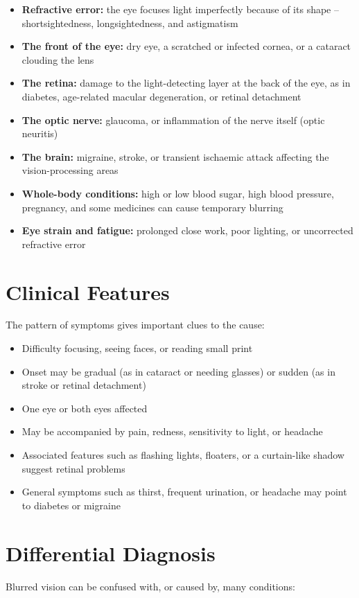\begin{itemize}
    \item \textbf{Refractive error:} the eye focuses light imperfectly because of its shape -- shortsightedness, longsightedness, and astigmatism
    \item \textbf{The front of the eye:} dry eye, a scratched or infected cornea, or a cataract clouding the lens
    \item \textbf{The retina:} damage to the light-detecting layer at the back of the eye, as in diabetes, age-related macular degeneration, or retinal detachment
    \item \textbf{The optic nerve:} glaucoma, or inflammation of the nerve itself (optic neuritis)
    \item \textbf{The brain:} migraine, stroke, or transient ischaemic attack affecting the vision-processing areas
    \item \textbf{Whole-body conditions:} high or low blood sugar, high blood pressure, pregnancy, and some medicines can cause temporary blurring
    \item \textbf{Eye strain and fatigue:} prolonged close work, poor lighting, or uncorrected refractive error
\end{itemize}

\section*{Clinical Features}
The pattern of symptoms gives important clues to the cause:

\begin{itemize}
    \item Difficulty focusing, seeing faces, or reading small print
    \item Onset may be gradual (as in cataract or needing glasses) or sudden (as in stroke or retinal detachment)
    \item One eye or both eyes affected
    \item May be accompanied by pain, redness, sensitivity to light, or headache
    \item Associated features such as flashing lights, floaters, or a curtain-like shadow suggest retinal problems
    \item General symptoms such as thirst, frequent urination, or headache may point to diabetes or migraine
\end{itemize}

\section*{Differential Diagnosis}
Blurred vision can be confused with, or caused by, many conditions:

